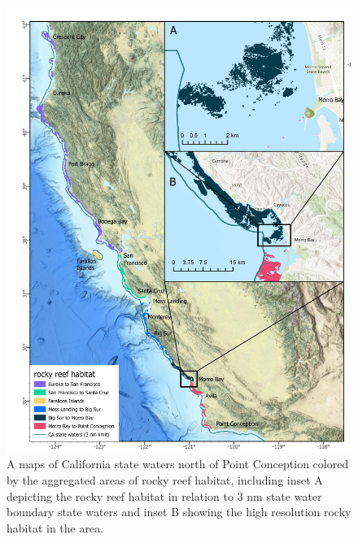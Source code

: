 \documentclass[
  12pt,
  authoryear,
  preprint,
  3p]{elsarticle}
\begin{document}
\begin{figure}

{\centering \includegraphics{figures/map.jpg}

}

\caption{\label{fig-map}A maps of California state waters north of Point
Conception colored by the aggregated areas of rocky reef habitat,
including inset A depicting the rocky reef habitat in relation to 3 nm
state water boundary state waters and inset B showing the high
resolution rocky habitat in the area.}

\end{figure}
\end{document}
